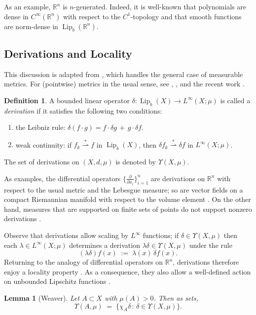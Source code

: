 \documentclass[reqno]{amsart}
\theoremstyle{plain}
\newtheorem{lemma}[thm]{Lemma}
\theoremstyle{definition}
\newtheorem{defn}[thm]{Definition}
\theoremstyle{remark}
\numberwithin{equation}{section}
\renewcommand{\d}{\delta}
\newcommand{\Lip}{\operatorname{Lip}}
\newcommand{\R}{\mathbb{R}}
\newcommand{\U}{\Upsilon}
\newcommand{\wsto}{\stackrel{*}{\rightharpoonup}}
\begin{document}
As an example, $\R^n$ is $n$-generated.  Indeed, it is well-known that polynomials are dense in $C^\infty(\R^n)$ with respect to the $C^1$-topology and that smooth functions are norm-dense in $\Lip_b(\R^n)$.  %



\subsection{Derivations and Locality}

This discussion is adapted from \cite{WeaverED}, which handles the general case of measurable metrics. For (pointwise) metrics in the usual sense, see \cite{HeinonenNC}, \cite{Gong}, and the recent work \cite{Schioppa}.

\begin{defn} \label{defn_deriv}
A bounded linear operator $\d : \Lip_b(X) \to L^\infty(X;\mu)$ is called a {\em derivation} if it satisfies the following two conditions:
\begin{enumerate}
\item the Leibniz rule: $\d(f \cdot g) = f \cdot \d g \,+\, g \cdot \d f$.
\item weak continuity: if $f_k \wsto f$ in $\Lip_b(X)$, then $\d f_k \wsto \d f$ in $L^\infty(X;\mu)$.
\end{enumerate}
The set of derivations on $(X,d,\mu)$ is denoted by $\U(X,\mu)$.
\end{defn}

As examples, the differential operators $\{\frac{\partial}{\partial x_i} \}_{i=1}^n$ are derivations on $\R^n$ with respect to the usual metric and the Lebesgue measure; so are vector fields on a compact Riemannian manifold with respect to the volume element \cite[Thm 37]{WeaverED}.  On the other hand, measures that are supported on finite sets of points do not support nonzero derivations \cite[Prop 32]{WeaverED}.

Observe that derivations allow scaling by $L^\infty$ functions; if $\d \in \U(X,\mu)$ then each $\lambda \in L^\infty(X;\mu)$ determines a derivation $\lambda \d \in \U(X,\mu)$ under the rule
$$
(\lambda \d)f(x) \;:=\; \lambda(x) \, \d f(x).
$$
Returning to the analogy of differential operators on $\R^n$, derivations therefore enjoy a locality property \cite[Lem 27]{WeaverED}. As a consequence, they also allow a well-defined action on unbounded Lipschitz functions \cite[Thm 2.15]{Gong_rigid}.


\begin{lemma}[Weaver] \label{lemma_locality}
Let $A \subset X$ with $\mu(A) > 0$.  Then as sets,
$$
\U(A,\mu) \;=\; \{ \chi_A\d \,:\, \d \in \U(X,\mu) \}.
$$
\end{lemma}
\end{document}
